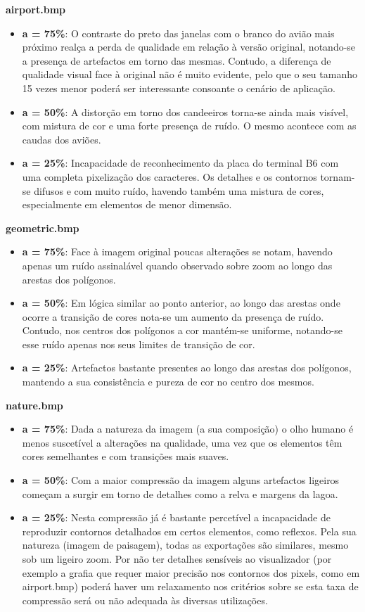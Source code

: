 \documentclass{article}
\begin{document}
\textbf{airport.bmp}
\begin{itemize}
    \item \textbf{a = 75\%}: O contraste do preto das janelas com o branco do avião mais próximo realça a perda de qualidade em relação à versão original, notando-se a presença de artefactos em torno das mesmas. Contudo, a diferença de qualidade visual face à original não é muito evidente, pelo que o seu tamanho 15 vezes menor poderá ser interessante consoante o cenário de aplicação.
    \item \textbf{a = 50\%}: A distorção em torno dos candeeiros torna-se ainda mais visível, com mistura de cor e uma forte presença de ruído. O mesmo acontece com as caudas dos aviões.
    \item \textbf{a = 25\%}: Incapacidade de reconhecimento da placa do terminal B6 com uma completa pixelização dos caracteres. Os detalhes e os contornos tornam-se difusos e com muito ruído, havendo também uma mistura de cores, especialmente em elementos de menor dimensão.
\end{itemize}

\textbf{geometric.bmp}
\begin{itemize}
    \item \textbf{a = 75\%}: Face à imagem original poucas alterações se notam, havendo apenas um ruído assinalável quando observado sobre zoom ao longo das arestas dos polígonos.
    \item \textbf{a = 50\%}: Em lógica similar ao ponto anterior, ao longo das arestas onde ocorre a transição de cores nota-se um aumento da presença de ruído. Contudo, nos centros dos polígonos a cor mantém-se uniforme, notando-se esse ruído apenas nos seus limites de transição de cor.
    \item \textbf{a = 25\%}: Artefactos bastante presentes ao longo das arestas dos polígonos, mantendo a sua consistência e pureza de cor no centro dos mesmos.
\end{itemize}

\textbf{nature.bmp}
\begin{itemize}
    \item \textbf{a = 75\%}: Dada a natureza da imagem (a sua composição) o olho humano é menos suscetível a alterações na qualidade, uma vez que os elementos têm cores semelhantes e com transições mais suaves.
    \item \textbf{a = 50\%}: Com a maior compressão da imagem alguns artefactos ligeiros começam a surgir em torno de detalhes como a relva e margens da lagoa.
    \item \textbf{a = 25\%}: Nesta compressão já é bastante percetível a incapacidade de reproduzir contornos detalhados em certos elementos, como reflexos. Pela sua natureza (imagem de paisagem), todas as exportações são similares, mesmo sob um ligeiro zoom. Por não ter detalhes sensíveis ao visualizador (por exemplo a grafia que requer maior precisão nos contornos dos pixels, como em airport.bmp) poderá haver um relaxamento nos critérios sobre se esta taxa de compressão será ou não adequada às diversas utilizações.
\end{itemize}
\end{document}
